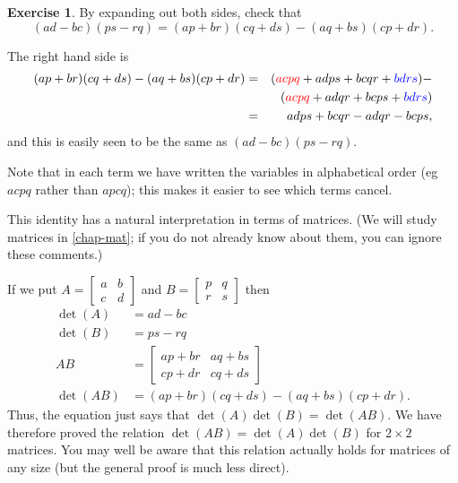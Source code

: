 \documentclass[a4paper]{book}
\newcommand{\RED}[1]{{\color{red}#1}}
\newcommand{\BLUE}[1]{{\color{blue}#1}}
\newcommand{\bbm}       {\begin{bmatrix}}
\newcommand{\bsm}       {\left[\begin{smallmatrix}}
\newcommand{\ebm}       {\end{bmatrix}}
\newcommand{\esm}       {\end{smallmatrix}\right]}
\newcommand{\tm}        {\times}
\renewcommand{\:}{\colon}
\theoremstyle{definition}
\newtheorem{exercise}[theorem]{Exercise}
\renewenvironment{solution}{\SolutionInline}{\endSolutionInline}
\begin{document}
\begin{exercise}
 By expanding out both sides, check that
 \[ (ad-bc)(ps-rq) = (ap+br)(cq+ds) - (aq+bs)(cp+dr). \]
\end{exercise}
\begin{solution}
 The right hand side is
 \begin{eqnarray*}
  (ap+br)(cq+ds) - (aq+bs)(cp+dr)
   &=& (\RED{ acpq} + adps + bcqr + \BLUE{ bdrs}) - \\
   & & (\RED{ acpq} + adqr + bcps + \BLUE{ bdrs}) \\
   &=& adps + bcqr - adqr - bcps,
 \end{eqnarray*}
 and this is easily seen to be the same as $(ad-bc)(ps-rq)$.

 Note that in each term we have written the variables in alphabetical
 order (eg $acpq$ rather than $apcq$); this makes it easier to see
 which terms cancel.
\end{solution}
\begin{background}
 This identity has a natural interpretation in terms of matrices.
 (We will study matrices in \autoref{chap-mat}; if you do not already
 know about them, you can ignore these comments.)

 If we put $A=\bsm a&b\\ c&d\esm$ and $B=\bsm p&q\\ r&s\esm$ then
 \begin{align*}
  \det(A)  &= ad-bc \\
  \det(B)  &= ps-rq \\
  AB       &= \bbm ap+br & aq+bs \\ cp+dr & cq+ds \ebm \\
  \det(AB) &= (ap+br)(cq+ds) - (aq+bs)(cp+dr).
 \end{align*}
 Thus, the equation just says that $\det(A)\det(B)=\det(AB)$.  We have
 therefore proved the relation $\det(AB)=\det(A)\det(B)$ for $2\tm 2$
 matrices.  You may well be aware that this relation actually holds
 for matrices of any size (but the general proof is much less direct).
\end{background}
\end{document}
